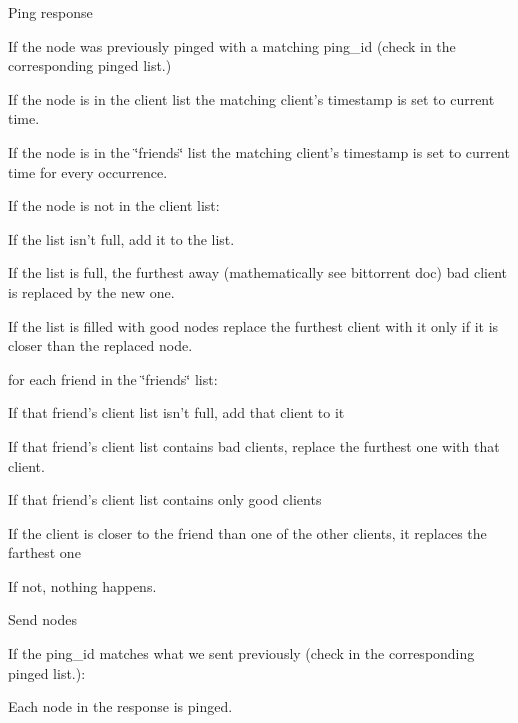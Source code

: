 \begin{DoxyItemize}
\item Ping response
\begin{DoxyItemize}
\item If the node was previously pinged with a matching ping\+\_\+id (check in the corresponding pinged list.)
\begin{DoxyItemize}
\item If the node is in the client list the matching client's timestamp is set to current time.
\item If the node is in the \char`\"{}friends\char`\"{} list the matching client's timestamp is set to current time for every occurrence.
\item If the node is not in the client list\+:
\begin{DoxyItemize}
\item If the list isn't full, add it to the list.
\item If the list is full, the furthest away (mathematically see bittorrent doc) bad client is replaced by the new one.
\item If the list is filled with good nodes replace the furthest client with it only if it is closer than the replaced node.
\end{DoxyItemize}
\item for each friend in the \char`\"{}friends\char`\"{} list\+:
\begin{DoxyItemize}
\item If that friend's client list isn't full, add that client to it
\item If that friend's client list contains bad clients, replace the furthest one with that client.
\item If that friend's client list contains only good clients
\begin{DoxyItemize}
\item If the client is closer to the friend than one of the other clients, it replaces the farthest one
\item If not, nothing happens.
\end{DoxyItemize}
\end{DoxyItemize}
\end{DoxyItemize}
\item Send nodes
\begin{DoxyItemize}
\item If the ping\+\_\+id matches what we sent previously (check in the corresponding pinged list.)\+:
\begin{DoxyItemize}
\item Each node in the response is pinged.
\end{DoxyItemize}
\end{DoxyItemize}
\end{DoxyItemize}
\end{DoxyItemize}

